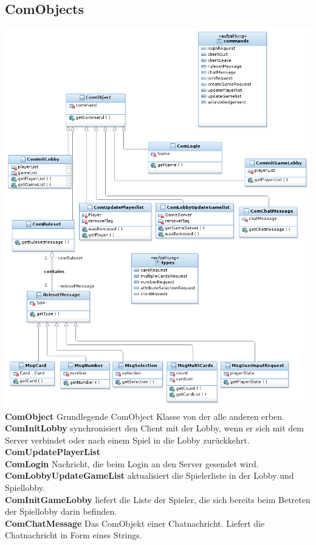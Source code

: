 \documentclass{article}
\begin{document}
\subsection{ComObjects}
\includegraphics[width=\textwidth]{ComDiagram}
\textbf{ComObject} Grundlegende ComObject Klasse von der alle anderen erben.\\
		\textbf{ComInitLobby} synchronisiert den Client mit der Lobby, wenn er sich mit dem Server verbindet oder nach einem Spiel in die Lobby zurückkehrt. \\
		\textbf{ComUpdatePlayerList} \\
		\textbf{ComLogin} Nachricht, die beim Login an den Server gesendet wird.\\
		\textbf{ComLobbyUpdateGameList} aktualisiert die Spielerliste in der Lobby und Spiellobby.\\
		\textbf{ComInitGameLobby} liefert die Liste der Spieler, die sich bereits beim Betreten der Spiellobby darin befinden. \\
		\textbf{ComChatMessage} Das ComObjekt einer Chatnachricht. Liefert die Chatnachricht in Form eines Strings.\\
\end{document}
